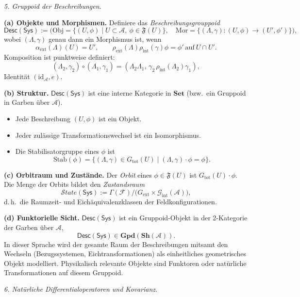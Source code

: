 \documentclass[10pt, letterpaper]{article}
\begin{document}
\bigskip
\emph{5. Gruppoid der Beschreibungen.}

\textbf{(a) Objekte und Morphismen.}
Definiere das \emph{Beschreibungsgrouppoid}
\[
\mathsf{Desc}(\mathsf{Sys})
:=\Big(
\mathrm{Obj}=\{(U,\phi)\mid U\subset\mathcal A,\ \phi\in\mathfrak F(U)\},\quad
\mathrm{Mor}=\{(\Lambda,\gamma):(U,\phi)\to(U',\phi')\}\Big),
\]
wobei $(\Lambda,\gamma)$ genau dann ein Morphismus ist, wenn
\[
\alpha_{\mathrm{ext}}(\Lambda)(U)=U',\qquad
\rho_{\mathrm{ext}}(\Lambda)\rho_{\mathrm{int}}(\gamma)\phi=\phi'\ \text{auf}\ U\cap U'.
\]
Komposition ist punktweise definiert:
\[
(\Lambda_2,\gamma_2)\circ(\Lambda_1,\gamma_1)
=(\Lambda_2\Lambda_1,\,\gamma_2\,\rho_{\mathrm{int}}(\Lambda_2)\gamma_1),
\]
Identität $(\mathrm{id}_{\mathcal A},e)$.

\textbf{(b) Struktur.}
$\mathsf{Desc}(\mathsf{Sys})$ ist eine interne Kategorie in $\mathbf{Set}$
(bzw.\ ein Gruppoid in Garben über $\mathcal A$).
\begin{itemize}
\item Jede Beschreibung $(U,\phi)$ ist ein Objekt.
\item Jeder zulässige Transformationswechsel ist ein Isomorphismus.
\item Die Stabilisatorgruppe eines $\phi$ ist
\[
\mathrm{Stab}(\phi)
=\{(\Lambda,\gamma)\in G_{\mathrm{tot}}(U)\mid
 (\Lambda,\gamma)\cdot\phi=\phi\}.
\]
\end{itemize}

\textbf{(c) Orbitraum und Zustände.}
Der \emph{Orbit} eines $\phi\in\mathfrak F(U)$ ist
$G_{\mathrm{tot}}(U)\cdot\phi$.  
Die Menge der Orbits bildet den \emph{Zustandsraum}
\[
\mathcal{S}tate(\mathsf{Sys})
:= \Gamma(\mathcal F)\big/\big(G_{\mathrm{ext}}\times\mathcal G_{\mathrm{int}}(\mathcal A)\big),
\]
d.\,h.\ die Raumzeit- und Eichäquivalenzklassen der Feldkonfigurationen.

\textbf{(d) Funktorielle Sicht.}
$\mathsf{Desc}(\mathsf{Sys})$ ist ein Gruppoid-Objekt in der 2-Kategorie der
Garben über $\mathcal A$,
\[
\mathsf{Desc}(\mathsf{Sys}) \in \mathbf{Gpd}(\mathbf{Sh}(\mathcal A)).
\]
In dieser Sprache wird der gesamte Raum der Beschreibungen mitsamt den
Wechseln (Bezugssystemen, Eichtransformationen) als einheitliches geometrisches
Objekt modelliert. Physikalisch relevante Objekte sind Funktoren oder
natürliche Transformationen auf diesem Gruppoid.


\emph{6. Natürliche Differentialoperatoren und Kovarianz.}
\end{document}
